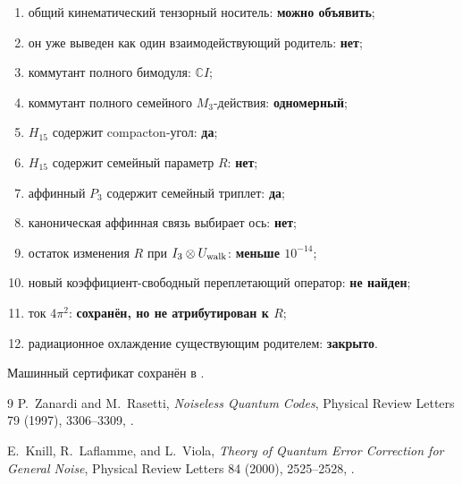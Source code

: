 \begin{protocol}
\begin{enumerate}
 \item общий кинематический тензорный носитель: \textbf{можно объявить};
 \item он уже выведен как один взаимодействующий родитель: \textbf{нет};
 \item коммутант полного бимодуля: \textbf{$\mathbb C I$};
 \item коммутант полного семейного $M_3$-действия: \textbf{одномерный};
 \item $H_{15}$ содержит compacton-угол: \textbf{да};
 \item $H_{15}$ содержит семейный параметр $R$: \textbf{нет};
 \item аффинный $P_3$ содержит семейный триплет: \textbf{да};
 \item каноническая аффинная связь выбирает ось: \textbf{нет};
 \item остаток изменения $R$ при $I_3\otimes U_{\rm walk}$:
 \textbf{меньше $10^{-14}$};
 \item новый коэффициент-свободный переплетающий оператор:
 \textbf{не найден};
 \item ток $4\pi^2$: \textbf{сохранён, но не атрибутирован к $R$};
 \item радиационное охлаждение существующим родителем: \textbf{закрыто}.
\end{enumerate}
\end{protocol}

Машинный сертификат сохранён в
.

\begin{thebibliography}{9}
P.~Zanardi and M.~Rasetti,
\emph{Noiseless Quantum Codes}, Physical Review Letters 79 (1997),
3306--3309, .

E.~Knill, R.~Laflamme, and L.~Viola,
\emph{Theory of Quantum Error Correction for General Noise},
Physical Review Letters 84 (2000), 2525--2528,
.
\end{thebibliography}